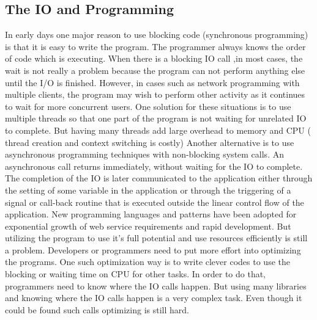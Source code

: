 \subsection{The IO and Programming}

In early days one major reason to use blocking code (synchronous programming) is that it is easy to write
the program. The programmer always knows the order of code which is executing. When there is a blocking IO call ,in most cases, the wait is not really a problem because the program can not perform anything else until the I/O is finished. However, in cases such as network programming with multiple
clients, the program may wish to perform other activity as it continues to wait for more concurrent
users.
One solution for these situations is to use multiple threads so that one part of the program is not
waiting for unrelated IO to complete. But having many threads add large overhead to memory and
CPU ( thread creation and context switching is costly)
Another alternative is to use asynchronous programming techniques with non-blocking system calls.
An asynchronous call returns immediately, without waiting for the IO to complete. The completion of
the IO is later communicated to the application either through the setting of some variable in the application or through the triggering of a signal or call-back routine that is executed outside the linear
control flow of the application.
New programming languages and patterns have been adopted for exponential growth of web service
requirements and rapid development. But utilizing the program to use it’s full potential and use
resources efficiently is still a problem. Developers or programmers need to put more effort into
optimizing the programs.
One such optimization way is to write clever codes to use the blocking or waiting time on CPU for
other tasks. In order to do that, programmers need to know where the IO calls happen. But using many
libraries and knowing where the IO calls happen is a very complex task. Even though it could be
found such calls optimizing is still hard.







